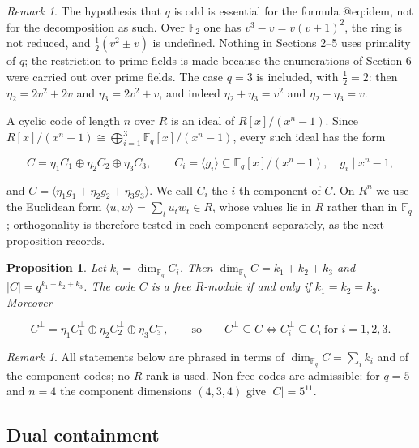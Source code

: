 \documentclass[11pt,reqno]{amsart}
\newtheorem{proposition}[theorem]{Proposition}
\theoremstyle{definition}
\theoremstyle{remark}
\newtheorem{remark}[theorem]{Remark}
\newcommand{\F}{\mathbb{F}}
\newcommand{\gen}[1]{\langle #1\rangle}
\begin{document}
\begin{remark}\label{char}
The hypothesis that $q$ is odd is essential for the formula @eq:idem, not for the decomposition as such. Over $\F_2$ one has $v^3-v=v(v+1)^2$, the ring is not reduced, and $\tfrac12(v^2\pm v)$ is undefined. Nothing in Sections 2--5 uses primality of $q$; the restriction to prime fields is made because the enumerations of Section 6 were carried out over prime fields. The case $q=3$ is included, with $\tfrac12=2$: then $\eta_2=2v^2+2v$ and $\eta_3=2v^2+v$, and indeed $\eta_2+\eta_3=v^2$ and $\eta_2-\eta_3=v$.
\end{remark}

A cyclic code of length $n$ over $R$ is an ideal of $R[x]/(x^n-1)$. Since $R[x]/(x^n-1)\cong\bigoplus_{i=1}^{3}\F_q[x]/(x^n-1)$, every such ideal has the form


\begin{equation}\label{eq:decomp}
C=\eta_1C_1\oplus\eta_2C_2\oplus\eta_3C_3,\qquad C_i=\gen{g_i}\subseteq\F_q[x]/(x^n-1),\quad g_i\mid x^n-1,
\end{equation}

and $C=\gen{\eta_1g_1+\eta_2g_2+\eta_3g_3}$. We call $C_i$ the $i$-th component of $C$. On $R^n$ we use the Euclidean form $\langle u,w\rangle=\sum_t u_tw_t\in R$, whose values lie in $R$ rather than in $\F_q$; orthogonality is therefore tested in each component separately, as the next proposition records.


\begin{proposition}\label{components}
Let $k_i=\dim_{\F_q}C_i$. Then $\dim_{\F_q}C=k_1+k_2+k_3$ and $|C|=q^{k_1+k_2+k_3}$. The code $C$ is a free $R$-module if and only if $k_1=k_2=k_3$. Moreover

\begin{equation}\label{eq:dualcomp}
C^\perp=\eta_1C_1^\perp\oplus\eta_2C_2^\perp\oplus\eta_3C_3^\perp,\qquad\text{so}\qquad C^\perp\subseteq C\iff C_i^\perp\subseteq C_i\ \text{for } i=1,2,3.
\end{equation}
\end{proposition}

\begin{remark}\label{rank}
All statements below are phrased in terms of $\dim_{\F_q}C=\sum_ik_i$ and of the component codes; no $R$-rank is used. Non-free codes are admissible: for $q=5$ and $n=4$ the component dimensions $(4,3,4)$ give $|C|=5^{11}$.
\end{remark}

\subsection{Dual containment}
\end{document}
